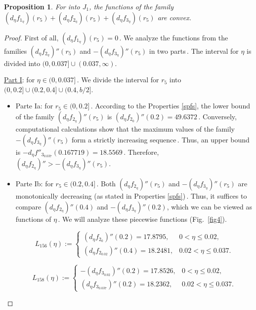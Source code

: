 \documentclass[final,11pt]{article}
\numberwithin{equation}{section}
\newtheorem{proposition}[theorem]{Proposition}
\theoremstyle{definition}
\begin{document}
\begin{proposition}\label{aux4}
For into $J_{1}$, the functions of the family $\left(d_{\eta}f_{1_{\eta}}\right)(r_{5})+\left(d_{\eta}f_{2_{\eta}}\right)(r_{5})+\left(d_{\eta}f_{3_{\eta}}\right)(r_{5})$ are convex.\end{proposition}

\begin{proof}
First of all, $\left(d_{\eta}f_{1_{\eta}}\right)(r_{5})=0$\,. We analyze the functions from the families $(d_{\eta}f_{2_{\eta}})''(r_{5})$ and $-(d_{\eta}f_{3_{\eta}})''(r_{5})$ in two parts\,. The interval for $\eta$  is divided into $(0,0.037]\cup(0.037,\infty)$.

\underline{Part I}: for $\eta\in(0,0.037]$\,. We divide the interval for $r_{5}$ into $(0,0.2]\cup(0.2,0.4]\cup(0.4,b/2]$.
\begin{itemize}
\item Parte Ia: for $r_{5}\in(0,0.2]$\,. According to the Properties \ref{spfs}, the lower bound of the family $(d_{\eta}f_{2_{\eta}})''(r_{5})$ is $(d_{\eta}f_{2_{0}})''(0.2)=49.6372$\,. Conversely, computational calculations show that the maximum values of the family $-(d_{\eta}f_{3_{\eta}})''(r_{5})$ form a strictly increasing sequence\,.  Thus, an upper bound is $-d_{\eta}f''_{3_{0.037}}(0.167719)=18.5569$\,. Therefore, $(d_{\eta}f_{2_{\eta}})''>-(d_{\eta}f_{3_{\eta}})''(r_{5})$.

\item Parte Ib: for $r_{5}\in(0.2,0.4]$\,. Both $(d_{\eta}f_{2_{\eta}})''(r_{5})$ and $-(d_{\eta}f_{3_{\eta}})''(r_{5})$ are monotonically decreasing (as stated in Properties \ref{spfs})\,. Thus, it suffices to compare $(d_{\eta}f_{2_{\eta}})''(0.4)$ and $-(d_{\eta}f_{3_{\eta}})''(0.2)$, which we can be viewed as functions of $\eta$\,. We will analyze these piecewise functions (Fig.~\ref{fig4}).

\begin{equation*}
    L_{156}(\eta):=\left\{ \begin{array}{lll}
        (d_{\eta}f_{2_{0}})''(0.2)=17.8795,  &0<\eta\leq 0.02,\\
             (d_{\eta}f_{2_{0.02}})''(0.4)=18.2481, & 0.02<\eta\leq 0.037.
               \end{array}
   \right.
\end{equation*}

\begin{equation*}
   L_{158}(\eta):=\left\{ \begin{array}{lll}
        -(d_{\eta}f_{3_{0.02}})''(0.2)=17.8526,  &0<\eta\leq 0.02,\\
             (d_{\eta}f_{3_{0.037}})''(0.2)=18.2362, & 0.02<\eta\leq 0.037.
               \end{array}
   \right. 
\end{equation*}


\end{itemize}
\end{proof}
\end{document}
